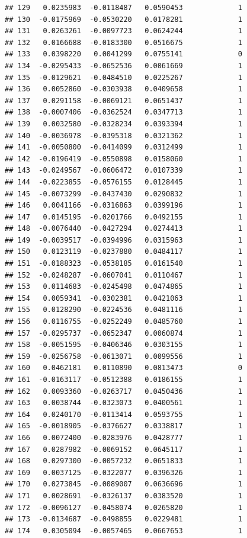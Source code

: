 \documentclass[12pt]{article}\usepackage[]{graphicx}\usepackage[]{xcolor}
\makeatletter
\newenvironment{kframe}{%
 \def\at@end@of@kframe{}%
 \ifinner\ifhmode%
  \def\at@end@of@kframe{\end{minipage}}%
  \begin{minipage}{\columnwidth}%
 \fi\fi%
 \def\FrameCommand##1{\hskip\@totalleftmargin \hskip-\fboxsep
 \colorbox{shadecolor}{##1}\hskip-\fboxsep
     \hskip-\linewidth \hskip-\@totalleftmargin \hskip\columnwidth}%
 \MakeFramed {\advance\hsize-\width
   \@totalleftmargin\z@ \linewidth\hsize
   \@setminipage}}%
 {\par\unskip\endMakeFramed%
 \at@end@of@kframe}
\newenvironment{knitrout}{}{} %
\makeatother
\begin{document}
\begin{knitrout}
\begin{kframe}
\begin{verbatim}
## 129   0.0235983  -0.0118487   0.0590453             1
## 130  -0.0175969  -0.0530220   0.0178281             1
## 131   0.0263261  -0.0097723   0.0624244             1
## 132   0.0166688  -0.0183300   0.0516675             1
## 133   0.0398220   0.0041299   0.0755141             0
## 134  -0.0295433  -0.0652536   0.0061669             1
## 135  -0.0129621  -0.0484510   0.0225267             1
## 136   0.0052860  -0.0303938   0.0409658             1
## 137   0.0291158  -0.0069121   0.0651437             1
## 138  -0.0007406  -0.0362524   0.0347713             1
## 139   0.0032580  -0.0328234   0.0393394             1
## 140  -0.0036978  -0.0395318   0.0321362             1
## 141  -0.0050800  -0.0414099   0.0312499             1
## 142  -0.0196419  -0.0550898   0.0158060             1
## 143  -0.0249567  -0.0606472   0.0107339             1
## 144  -0.0223855  -0.0576155   0.0128445             1
## 145  -0.0073299  -0.0437430   0.0290832             1
## 146   0.0041166  -0.0316863   0.0399196             1
## 147   0.0145195  -0.0201766   0.0492155             1
## 148  -0.0076440  -0.0427294   0.0274413             1
## 149  -0.0039517  -0.0394996   0.0315963             1
## 150   0.0123119  -0.0237880   0.0484117             1
## 151  -0.0188323  -0.0538185   0.0161540             1
## 152  -0.0248287  -0.0607041   0.0110467             1
## 153   0.0114683  -0.0245498   0.0474865             1
## 154   0.0059341  -0.0302381   0.0421063             1
## 155   0.0128290  -0.0224536   0.0481116             1
## 156   0.0116755  -0.0252249   0.0485760             1
## 157  -0.0295737  -0.0652347   0.0060874             1
## 158  -0.0051595  -0.0406346   0.0303155             1
## 159  -0.0256758  -0.0613071   0.0099556             1
## 160   0.0462181   0.0110890   0.0813473             0
## 161  -0.0163117  -0.0512388   0.0186155             1
## 162   0.0093360  -0.0263717   0.0450436             1
## 163   0.0038744  -0.0323073   0.0400561             1
## 164   0.0240170  -0.0113414   0.0593755             1
## 165  -0.0018905  -0.0376627   0.0338817             1
## 166   0.0072400  -0.0283976   0.0428777             1
## 167   0.0287982  -0.0069152   0.0645117             1
## 168   0.0297300  -0.0057232   0.0651833             1
## 169   0.0037125  -0.0322077   0.0396326             1
## 170   0.0273845  -0.0089007   0.0636696             1
## 171   0.0028691  -0.0326137   0.0383520             1
## 172  -0.0096127  -0.0458074   0.0265820             1
## 173  -0.0134687  -0.0498855   0.0229481             1
## 174   0.0305094  -0.0057465   0.0667653             1

\end{verbatim}
\end{kframe}
\end{knitrout}
\end{document}
